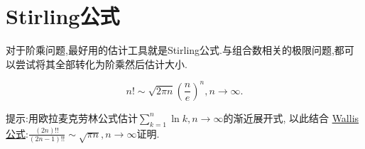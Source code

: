 \documentclass[lang=cn,newtx,10pt,scheme=chinese]{elegantbook}
\begin{document}
\section{Stirling公式}

对于阶乘问题,最好用的估计工具就是Stirling公式.与组合数相关的极限问题,都可以尝试将其全部转化为阶乘然后估计大小.

\begin{theorem}[Stirling公式]\label{theorem:Stirling公式}
\[
n!\sim\sqrt{2\pi n}\left(\frac{n}{e}\right)^{n},n\to\infty.
\]
\end{theorem}
\begin{note}
提示:用欧拉麦克劳林公式估计\(\sum_{k = 1}^{n}\ln k,n\to\infty\)的渐近展开式, 以此结合 \hyperref[theorem:Wallis公式]{Wallis 公式}:\(\frac{(2n)!!}{(2n - 1)!!}\sim\sqrt{\pi n},n\to\infty\)证明.
\end{note}
\end{document}
